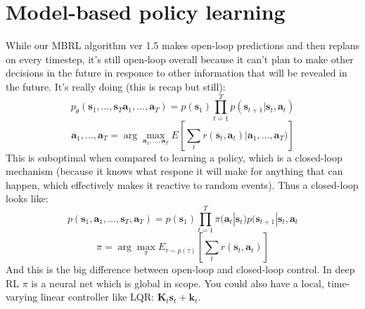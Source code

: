 \documentclass{report}
\newcommand{\argmax}{\arg\!\max}
\begin{document}
\section{Model-based policy learning}
While our MBRL algorithm ver 1.5 makes open-loop predictions and then replans on every timestep, 
it's still open-loop overall because it can't plan to make other decisions in the future in responce to other information 
that will be revealed in the future.
It's really doing (this is recap but still):
\begin{equation}
		p_\theta ( \bm{s}_{1}, \dots , \bm{s}_{T} \bm{a}_{1}, \dots , \bm{a}_{T}) =
		p(\bm{s}_{1}) \prod_{t=1}^{T} p(\bm{s}_{t+1} | \bm{s}_{t}, \bm{a}_{t}) 
\end{equation}
\begin{equation}
		\bm{a}_{1}, \dots , \bm{a}_{T} = \argmax_{\bm{a}_{1}, \dots , \bm{a}_{T}} E \left[ 
		\sum_{t}^{} r (\bm{s}_{t}, \bm{a}_{t} )| \bm{a}_{1}, \dots , \bm{a}_{T})\right] 
\end{equation}
This is suboptimal when compared to learning a policy, which is a closed-loop mechanism (because it knows
what respone it will make for anything that can happen, which effectively makes it reactive to random events).
Thus a closed-loop looks like:
\begin{equation}
		p(\bm{s}_{1}, \bm{a}_{1}, \dots, \bm{s}_{T}, \bm{a}_{T}) =
		p(\bm{s}_{1}) \prod_{t=1}^{T} \pi(\bm{a}_{t}| \bm{s}_{t}) p(\bm{s}_{t+1}| \bm{s}_{t}, \bm{a}_{t} 
\end{equation}
\begin{equation}
		\pi = \argmax_\pi E_{\tau \sim p(\tau)} \left[ \sum_{t}^{} r (\bm{s}_{t}, \bm{a}_{t} ) \right] 
\end{equation}
And this is the big difference between open-loop and closed-loop control.
In deep RL $\pi$ is a neural net which is global in scope.
You could also have a local, time-varying linear controller like LQR: $\bm{K}_{t}\bm{s}_{t} + \bm{k}_{t}$.
\end{document}
